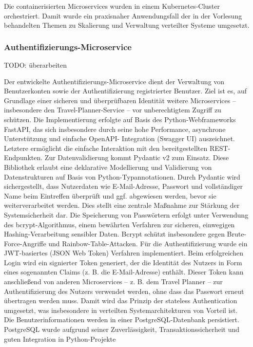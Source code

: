 Die containerisierten Microservices wurden in einem Kubernetes-Cluster orchestriert. Damit wurde ein praxisnaher Anwendungsfall der in der Vorlesung behandelten Themen zu Skalierung und Verwaltung verteilter Systeme umgesetzt.

\subsubsection{Authentifizierungs-Microservice}

TODO: überarbeiten

Der entwickelte Authentifizierungs-Microservice dient der Verwaltung von Benutzerkonten sowie
der Authentifizierung registrierter Benutzer. Ziel ist es, auf Grundlage einer sicheren und
überprüfbaren Identität weitere Microservices – insbesondere den Travel-Planner-Service – vor
unberechtigtem Zugriff zu schützen.
Die Implementierung erfolgte auf Basis des Python-Webframeworks FastAPI, das sich
insbesondere durch seine hohe Performance, asynchrone Unterstützung und einfache OpenAPI-
Integration (Swagger UI) auszeichnet. Letztere ermöglicht die einfache Interaktion mit den
bereitgestellten REST-Endpunkten.
Zur Datenvalidierung kommt Pydantic v2 zum Einsatz. Diese Bibliothek erlaubt eine deklarative
Modellierung und Validierung von Datenstrukturen auf Basis von Python-Typannotationen. Durch
Pydantic wird sichergestellt, dass Nutzerdaten wie E-Mail-Adresse, Passwort und vollständiger
Name beim Eintreffen überprüft und ggf. abgewiesen werden, bevor sie weiterverarbeitet werden.
Dies stellt eine zentrale Maßnahme zur Stärkung der Systemsicherheit dar.
Die Speicherung von Passwörtern erfolgt unter Verwendung des bcrypt-Algorithmus, einem
bewährten Verfahren zur sicheren, einwegigen Hashing-Verarbeitung sensibler Daten. Bcrypt
schützt insbesondere gegen Brute-Force-Angriffe und Rainbow-Table-Attacken.
Für die Authentifizierung wurde ein JWT-basiertes (JSON Web Token) Verfahren implementiert.
Beim erfolgreichen Login wird ein signierter Token generiert, der die Identität des Nutzers in Form
eines sogenannten Claims (z. B. die E-Mail-Adresse) enthält. Dieser Token kann anschließend von
anderen Microservices – z. B. dem Travel Planner – zur Authentifizierung des Nutzers verwendet
werden, ohne dass das Passwort erneut übertragen werden muss. Damit wird das Prinzip der
stateless Authentication umgesetzt, was insbesondere in verteilten Systemarchitekturen von Vorteil
ist.
Die Benutzerinformationen werden in einer PostgreSQL-Datenbank persistiert. PostgreSQL wurde
aufgrund seiner Zuverlässigkeit, Transaktionssicherheit und guten Integration in Python-Projekte
